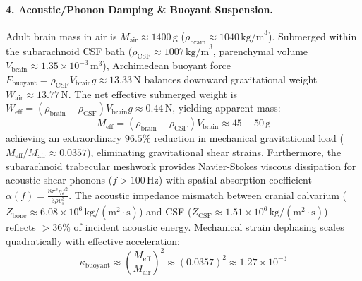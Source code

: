 \documentclass[10pt,twocolumn,3p]{article}
\begin{document}
\paragraph{4. Acoustic/Phonon Damping \& Buoyant Suspension.}
Adult brain mass in air is $M_{\text{air}} \approx 1400\,\text{g}$ ($\rho_{\text{brain}} \approx 1040\,\text{kg/m}^3$). Submerged within the subarachnoid CSF bath ($\rho_{\text{CSF}} \approx 1007\,\text{kg/m}^3$, parenchymal volume $V_{\text{brain}} \approx 1.35 \times 10^{-3}\,\text{m}^3$), Archimedean buoyant force $F_{\text{buoyant}} = \rho_{\text{CSF}} V_{\text{brain}} g \approx 13.33\,\text{N}$ balances downward gravitational weight $W_{\text{air}} \approx 13.77\,\text{N}$. The net effective submerged weight is $W_{\text{eff}} = (\rho_{\text{brain}} - \rho_{\text{CSF}}) V_{\text{brain}} g \approx 0.44\,\text{N}$, yielding apparent mass:
\begin{equation}
    M_{\text{eff}} = (\rho_{\text{brain}} - \rho_{\text{CSF}}) V_{\text{brain}} \approx 45 - 50\,\text{g}
    \label{eq:effective_buoyant_mass}
\end{equation}
achieving an extraordinary $96.5\%$ reduction in mechanical gravitational load ($M_{\text{eff}}/M_{\text{air}} \approx 0.0357$), eliminating gravitational shear strains. Furthermore, the subarachnoid trabecular meshwork provides Navier-Stokes viscous dissipation for acoustic shear phonons ($f > 100\,\text{Hz}$) with spatial absorption coefficient $\alpha(f) = \frac{8\pi^2 \eta f^2}{3\rho v_s^3}$. The acoustic impedance mismatch between cranial calvarium ($Z_{\text{bone}} \approx 6.08 \times 10^6\,\text{kg}/(\text{m}^2\cdot\text{s})$) and CSF ($Z_{\text{CSF}} \approx 1.51 \times 10^6\,\text{kg}/(\text{m}^2\cdot\text{s})$) reflects $> 36\%$ of incident acoustic energy. Mechanical strain dephasing scales quadratically with effective acceleration:
\begin{equation}
    \kappa_{\text{buoyant}} \approx \left(\frac{M_{\text{eff}}}{M_{\text{air}}}\right)^2 \approx (0.0357)^2 \approx 1.27 \times 10^{-3}
\end{equation}
\end{document}
